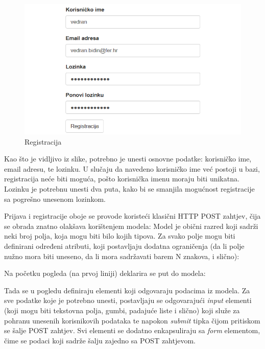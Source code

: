 \documentclass[times, utf8, zavrsni]{fer}
\begin{document}
\begin{figure}[H]
\centering
\includegraphics[width=\textwidth,height=\textheight,keepaspectratio]{img/registracija.png}
\caption{Registracija}
\label{fig:registracija}
\end{figure}

Kao što je vidljivo iz slike, potrebno je unesti osnovne podatke: korisničko ime, email adresu, te lozinku. U slučaju da navedeno korisničko ime već postoji u bazi, registracija neće biti moguća, pošto korisnička imenu moraju biti unikatna. Lozinku je potrebnu unesti dva puta, kako bi se smanjila mogućnost registracije sa pogrešno unesenom lozinkom.

Prijava i registracije oboje se provode koristeći klasični HTTP POST zahtjev, čija se obrada znatno olakšava korištenjem modela:
Model je obični razred koji sadrži neki broj polja, koja mogu biti bilo kojih tipova. Za svako polje mogu biti definirani određeni atributi, koji postavljaju dodatna ograničenja (da li polje nužno mora biti uneseno, da li mora sadržavati barem N znakova, i slično):

\lstset{style=csharp}


Na početku pogleda (na prvoj liniji) deklarira se put do modela:

\lstset{style=html}


Tada se u pogledu definiraju elementi koji odgovaraju podacima iz modela. Za sve podatke koje je potrebno unesti, postavljaju se odgovarajući \emph{input} elementi (koji mogu biti tekstovna polja, gumbi, padajuće liste i slično) koji služe za pohranu unesenih korisnikovih podataka te napokon \emph{submit} tipka čijom pritiskom se šalje POST zahtjev. Svi elementi se dodatno enkapsuliraju sa \emph{form} elementom, čime se podaci koji sadrže šalju zajedno sa POST zahtjevom.
\end{document}
